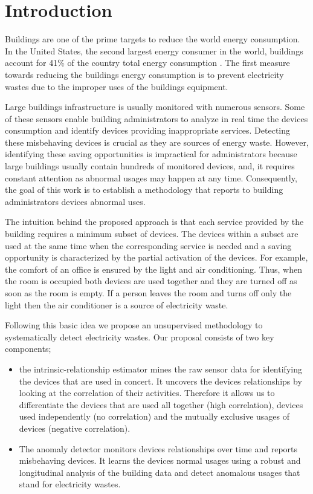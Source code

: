 \section{Introduction}
Buildings are one of the prime targets to reduce the world energy consumption.
In the United States, the second largest energy consumer in the world, buildings account for 41\% of the country total energy consumption \cite{aer2011}.
The first measure towards reducing the buildings energy consumption is to prevent electricity wastes due to the improper uses of the buildings equipment.

Large buildings infrastructure is usually monitored with numerous sensors.
Some of these sensors enable building administrators to analyze in real time the devices consumption and identify devices providing inappropriate services.
Detecting these misbehaving devices is crucial as they are sources of energy waste.
However, identifying these saving opportunities is impractical for administrators because large buildings usually contain hundreds of monitored devices, and, it requires constant attention as abnormal usages may happen at any time.
Consequently, the goal of this work is to establish a methodology that reports to building administrators devices abnormal uses.

The intuition behind the proposed approach is that each service provided by the building requires a minimum subset of devices.
The devices within a subset are used at the same time when the corresponding service is needed and a saving opportunity is characterized by the partial activation of the devices.
For example, the comfort of an office is ensured by the light and air conditioning.
Thus, when the room is occupied both devices are used together and they are turned off as soon as the room is empty.
If a person leaves the room and turns off only the light then the air conditioner is a source of electricity waste.

Following this basic idea we propose an unsupervised methodology to systematically detect electricity wastes.
Our proposal consists of two key components;
\begin{itemize}
 \item the intrinsic-relationship estimator mines the raw sensor data for identifying the devices that are used in concert.
 It uncovers the devices relationships by looking at the correlation of their activities. 
 Therefore it allows us to differentiate the devices that are used all together (high correlation), devices used independently (no correlation) and the mutually exclusive usages of devices (negative correlation).
 \item The anomaly detector monitors devices relationships over time and reports misbehaving devices.
 It learns the devices normal usages using a robust and longitudinal analysis of the building data and detect anomalous usages that stand for electricity wastes.
\end{itemize}


